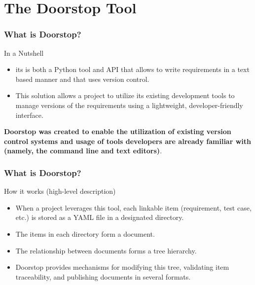 \documentclass[aspectratio=169]{beamer}
\begin{document}
\section*{The Doorstop Tool}
\begin{frame}
  \frametitle{What is Doorstop?}
  \begin{block}{In a Nutshell}
    \begin{itemize}
      \item its is both a Python tool and API that allows to write requirements in a text based manner and that uses version control. 
      \item This solution allows a project to utilize its existing development tools to manage versions of the requirements using a lightweight, developer-friendly interface.
    \end{itemize}
  \end{block}
  {\bf Doorstop was created to enable the utilization of existing version control systems and usage of tools developers are already familiar with (namely, the command line and text editors)}.
\end{frame}
%

\begin{frame}
  \frametitle{What is Doorstop?}
    \begin{block}{How it works (high-level description)}
    \begin{itemize}
      \item When a project leverages this tool, each linkable item (requirement, test case, etc.) is stored as a YAML file in a designated directory. 
      \item The items in each directory form a document.
      \item The relationship between documents forms a tree hierarchy.
      \item Doorstop provides mechanisms for modifying this tree, validating item traceability, and publishing documents in several formats.  
  \end{itemize}
 \end{block}
\end{frame}
\end{document}

